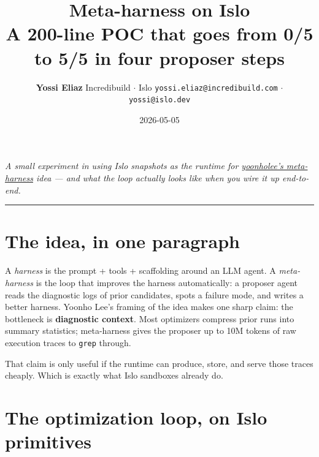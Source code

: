 \documentclass[11pt]{article}
\title{\vspace{-2em}\textbf{Meta-harness on Islo}\\[0.3em]
\large\normalfont A 200-line POC that goes from 0/5 to 5/5 in four proposer steps}
\author{\normalsize \textbf{Yossi Eliaz}\quad
  \textcolor{dim}{\small Incredibuild $\cdot$ Islo \quad
  \texttt{yossi.eliaz@incredibuild.com} $\cdot$ \texttt{yossi@islo.dev}}}
\date{\normalsize 2026-05-05}
\begin{document}
\maketitle
\thispagestyle{fancy}

\begin{center}
\textit{\color{dim}\small A small experiment in using Islo snapshots as the runtime for
\href{https://yoonholee.com/meta-harness/}{yoonholee's meta-harness} idea ---
and what the loop actually looks like when you wire it up end-to-end.}
\end{center}

\vspace{0.5em}
{\color{border}\hrule}
\vspace{1em}

\section*{The idea, in one paragraph}

A \emph{harness} is the prompt + tools + scaffolding around an LLM agent. A
\emph{meta-harness} is the loop that improves the harness automatically: a
proposer agent reads the diagnostic logs of prior candidates, spots a failure
mode, and writes a better harness. Yoonho Lee's framing of the idea makes one
sharp claim: the bottleneck is \textbf{diagnostic context}. Most optimizers
compress prior runs into summary statistics; meta-harness gives the proposer
up to 10M tokens of raw execution traces to \texttt{grep} through.

That claim is only useful if the runtime can produce, store, and serve those
traces cheaply. Which is exactly what Islo sandboxes already do.

\section*{The optimization loop, on Islo primitives}
\end{document}
